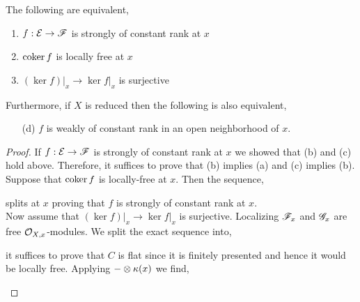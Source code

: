 \documentclass[12pt]{article}
\begin{document}
\begin{lemma}
The following are equivalent,
\begin{enumerate}
\item $f : \mathcal{E} \to \mathscr{F}$ is strongly of constant rank at $x$
\item $\operatorname{\mathrm{coker}}{f}$ is locally free at $x$
\item $(\ker{f})|_x \to \ker{f|_x}$ is surjective
\end{enumerate}
Furthermore, if $X$ is reduced then the following is also equivalent,
\begin{enumerate}
\item[(d)] $f$ is weakly of constant rank in an open neighborhood of $x$.
\end{enumerate}
\end{lemma}

\begin{proof}
If $f : \mathcal{E} \to \mathscr{F}$ is strongly of constant rank at $x$ we showed that (b) and (c) hold above. Therefore, it suffices to prove that (b) implies (a) and (c) implies (b). 
\bigskip\\
Suppose that $\operatorname{\mathrm{coker}}{f}$ is locally-free at $x$. Then the sequence,
\begin{center}
\end{center}
splits at $x$ proving that $f$ is strongly of constant rank at $x$.
\bigskip\\
Now assume that $(\ker{f})|_x \to \ker{f|_x}$ is surjective. Localizing $\mathscr{F}_x$ and $\mathscr{G}_x$ are free $\mathcal{O}_{X, x}$-modules. We split the exact sequence into,
\begin{center}
\end{center}
it suffices to prove that $C$ is flat since it is finitely presented and hence it would be locally free. Applying $- \otimes \kappa(x)$ we find,
\begin{center}
\end{center}
\end{proof}
\end{document}
